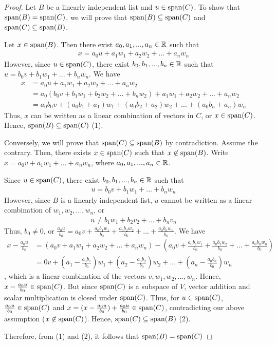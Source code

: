 \begin{proof}
    Let $B$ be a linearly independent list and $u\in\textnormal{span}(C)$. To show that $\textnormal{span}(B)=\textnormal{span}(C)$, we will prove that $\textnormal{span}(B)\subseteq\textnormal{span}(C)$ and $\textnormal{span}(C)\subseteq\textnormal{span}(B)$. 

    Let $x\in\textnormal{span}(B)$. Then there exist $a_0,a_1,...,a_n\in\mathbb R$ such that 
    \[
        \begin{aligned}
            x=a_0u+a_1w_1+a_2w_2+...+a_nw_n
        \end{aligned}
    \]
    However, since $u\in\textnormal{span}(C)$, there exist $b_0,b_1,...,b_n\in\mathbb R$ such that $u=b_0v+b_1w_1+...+b_nw_n$. We have 
    \[
        \begin{aligned}
            x &= a_0u+a_1w_1+a_2w_2+...+a_nw_2\\
              &= a_0(b_0v+b_1w_1+b_2w_2+...+b_nw_2)+a_1w_1+a_2w_2+...+a_nw_2\\
              &= a_0b_0v+(a_0b_1+a_1)w_1+(a_0b_2+a_2)w_2+...+(a_0b_n+a_n)w_n
        \end{aligned}
    \]
    Thus, $x$ can be written as a linear combination of vectors in $C$, or $x\in\textnormal{span}(C)$. Hence, $\textnormal{span}(B)\subseteq\textnormal{span}(C)$ (1).

    Conversely, we will prove that $\textnormal{span}(C)\subseteq\textnormal{span}(B)$ by contradiction. Assume the contrary. Then, there exists $x\in\textnormal{span}(C)$ such that $x\not\in\textnormal{span}(B)$. Write $x=a_0v+a_1w_1+...+a_nw_n$, where $a_0,a_1,...,a_n\in\mathbb R$.

    Since $u\in\textnormal{span}(C)$, there exist $b_0,b_1,...,b_n\in\mathbb R$ such that 
    \[
        \begin{aligned}
            u=b_0v+b_1w_1+...+b_nw_n
        \end{aligned}
    \]
    However, since $B$ is a linearly independent list, $u$ cannot be written as a linear combination of $w_1,w_2,...,w_n$, or 
    \[
        \begin{aligned}
            u\not=b_1w_1+b_2v_2+...+b_nv_n
        \end{aligned}
    \]
    Thus, $b_0\not=0$, or $\frac{a_0u}{b_0}=a_0v+\frac{a_0b_1w_1}{b_0}+\frac{a_0b_2w_2}{b_0}+...+\frac{a_0b_nw_n}{b_0}$. We have 
    \[
        \begin{aligned}
            x-\frac{a_0u}{b_0} &= (a_0v+a_1w_1+a_2w_2+...+a_nw_n)-(a_0v+\frac{a_0b_1w_1}{b_0}+\frac{a_0b_2w_2}{b_0}+...+\frac{a_0b_nw_n}{b_0})\\
                               &= 0v+(a_1-\frac{a_0b_1}{b_0})w_1+(a_2-\frac{a_0b_2}{b_0})w_2+...+(a_n-\frac{a_0b_n}{b_0})w_n
        \end{aligned}
    \]  
    , which is a linear combination of the vectors $v,w_1,w_2,...,w_n$. Hence, $x-\frac{a_0u}{b_0}\in\textnormal{span}(C)$. But since $\textnormal{span}(C)$ is a subspace of $V$, vector addition and scalar multiplication is closed under $\textnormal{span}(C)$. Thus, for $u\in\textnormal{span}(C)$, $\frac{a_0u}{b_0}\in\textnormal{span}(C)$ and $x=(x-\frac{a_0u}{b_0})+\frac{a_0u}{b_0}\in\textnormal{span}(C)$, contradicting our above assumption ($x\not\in\textnormal{span}(C)$). Hence, $\textnormal{span}(C)\subseteq\textnormal{span}(B)$ (2).

    Therefore, from (1) and (2), it follows that $\textnormal{span}(B)=\textnormal{span}(C)$
\end{proof}